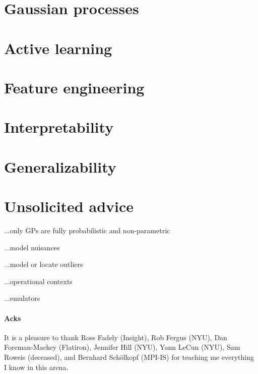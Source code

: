 \documentclass[12pt, letterpaper]{article}
\begin{document}
\section{Gaussian processes}

\section{Active learning}

\section{Feature engineering}

\section{Interpretability}

\section{Generalizability}

\section{Unsolicited advice}

...only GPs are fully probabilistic and non-parametric

...model nuisances

...model or locate outliers

...operational contexts

...emulators

\paragraph{Acks}
It is a pleasure to thank
  Ross Fadely (Insight),
  Rob Fergus (NYU),
  Dan Foreman-Mackey (Flatiron),
  Jennifer Hill (NYU),
  Yann LeCun (NYU),
  Sam Roweis (deceased),
  and
  Bernhard Sch\"olkopf (MPI-IS)
for teaching me everything I know in this arena.
\end{document}
